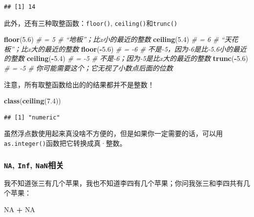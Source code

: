 \documentclass[]{book}
\newenvironment{Shaded}{\begin{snugshade}}{\end{snugshade}}
\newcommand{\CommentTok}[1]{\textcolor[rgb]{0.56,0.35,0.01}{\textit{#1}}}
\newcommand{\FloatTok}[1]{\textcolor[rgb]{0.00,0.00,0.81}{#1}}
\newcommand{\KeywordTok}[1]{\textcolor[rgb]{0.13,0.29,0.53}{\textbf{#1}}}
\newcommand{\NormalTok}[1]{#1}
\newcommand{\OperatorTok}[1]{\textcolor[rgb]{0.81,0.36,0.00}{\textbf{#1}}}
\newcommand{\OtherTok}[1]{\textcolor[rgb]{0.56,0.35,0.01}{#1}}
\newcommand{\StringTok}[1]{\textcolor[rgb]{0.31,0.60,0.02}{#1}}
\begin{document}
\begin{verbatim}
## [1] 14
\end{verbatim}

此外，还有三种取整函数：\texttt{floor()}, \texttt{ceiling()}和\texttt{trunc()}

\begin{Shaded}
\begin{Highlighting}[]
\KeywordTok{floor}\NormalTok{(}\FloatTok{5.6}\NormalTok{) }\CommentTok{# = 5 # “地板”；比x小的最近的整数}
\KeywordTok{ceiling}\NormalTok{(}\FloatTok{5.4}\NormalTok{) }\CommentTok{# = 6 # “天花板”；比x大的最近的整数}
\KeywordTok{floor}\NormalTok{(}\OperatorTok{-}\FloatTok{5.6}\NormalTok{) }\CommentTok{# = -6 # 不是-5，因为-6是比-5.6小的最近的整数}
\KeywordTok{ceiling}\NormalTok{(}\OperatorTok{-}\FloatTok{5.4}\NormalTok{) }\CommentTok{# = -5 # 不是-6；因为-5是比x大的最近的整数}
\KeywordTok{trunc}\NormalTok{(}\OperatorTok{-}\FloatTok{5.6}\NormalTok{) }\CommentTok{# = -5 # 你可能需要这个；它无视了小数点后面的位数}
\end{Highlighting}
\end{Shaded}

注意，所有取整函数给出的的结果都并不是整数！

\begin{Shaded}
\begin{Highlighting}[]
\KeywordTok{class}\NormalTok{(}\KeywordTok{ceiling}\NormalTok{(}\FloatTok{7.4}\NormalTok{))}
\end{Highlighting}
\end{Shaded}

\begin{verbatim}
## [1] "numeric"
\end{verbatim}

虽然浮点数使用起来真没啥不方便的，但是如果你一定需要的话，可以用\texttt{as.integer()}函数把它转换成真·整数。

\hypertarget{math-NA}{%
\subsubsection{\texorpdfstring{\texttt{NA}, \texttt{Inf}, \texttt{NaN}相关}{NA, Inf, NaN相关}}\label{math-NA}}

我不知道张三有几个苹果，我也不知道李四有几个苹果；你问我张三和李四共有几个苹果：

\begin{Shaded}
\begin{Highlighting}[]
\OtherTok{NA} \OperatorTok{+}\StringTok{ }\OtherTok{NA}
\end{Highlighting}
\end{Shaded}
\end{document}
